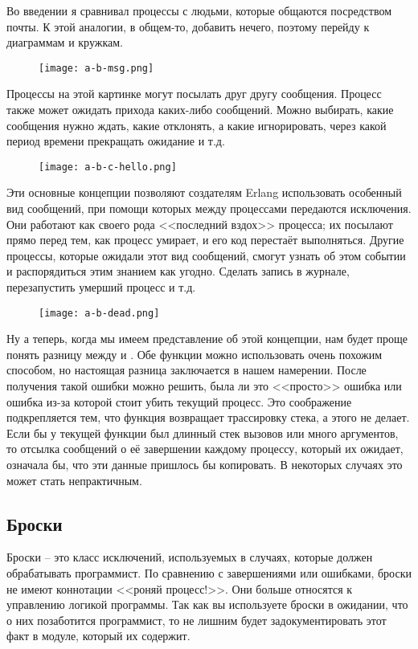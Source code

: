 Во введении я сравнивал процессы с людьми, которые общаются посредством почты. К этой аналогии, в общем\--то, добавить нечего, поэтому перейду к диаграммам и кружкам.
\begin{figure}[h!]
    \centering
    \texttt{[image: a-b-msg.png]}
\end{figure}

Процессы на этой картинке могут посылать друг другу сообщения.
Процесс также может ожидать прихода каких\--либо сообщений.
Можно выбирать, какие сообщения нужно ждать, какие отклонять, а какие игнорировать, через какой период времени прекращать ожидание и т.д.
\begin{figure}[h!]
    \centering
    \texttt{[image: a-b-c-hello.png]}
\end{figure}

Эти основные концепции позволяют создателям Erlang использовать особенный вид сообщений, при помощи которых между процессами передаются исключения.
Они работают как своего рода <<последний вздох>> процесса; их посылают прямо перед тем, как процесс умирает, и его код перестаёт выполняться.
Другие процессы, которые ожидали этот вид сообщений, смогут узнать об этом событии и распорядиться этим знанием как угодно.
Сделать запись в журнале, перезапустить умерший процесс и т.д.
\begin{figure}[h!]
    \centering
    \texttt{[image: a-b-dead.png]}
\end{figure}

Ну а теперь, когда мы имеем представление об этой концепции, нам будет проще понять разницу между  и .
Обе функции можно использовать очень похожим способом, но настоящая разница заключается в нашем намерении.
После получения такой ошибки можно решить, была ли это <<просто>> ошибка или ошибка из\--за которой стоит убить текущий процесс.
Это соображение подкрепляется тем, что функция  возвращает трассировку стека, а  этого не делает.
Если бы у текущей функции был длинный стек вызовов или много аргументов, то отсылка сообщений о её завершении каждому процессу, который их ожидает, означала бы, что эти данные пришлось бы копировать. В некоторых случаях это может стать непрактичным.
\subsection{Броски}
\label{throws}
Броски \--- это класс исключений, используемых в случаях, которые должен обрабатывать программист.
По сравнению с завершениями  или ошибками, броски не имеют коннотации <<роняй процесс!>>.
Они больше относятся к управлению логикой программы.
Так как вы используете броски в ожидании, что о них позаботится программист, то не лишним будет задокументировать этот факт в модуле, который их содержит.

